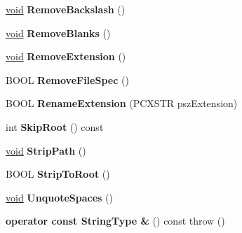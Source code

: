 \begin{DoxyCompactItemize}
\item 
\mbox{\label{class_a_t_l_1_1_c_path_t_ad9db826f37bdb070e0e70260bdcdcb09}} 
\hyperlink{interfacevoid}{void} {\bfseries Remove\+Backslash} ()
\item 
\mbox{\label{class_a_t_l_1_1_c_path_t_a18b9704efda370655dc142fdb7efd0d8}} 
\hyperlink{interfacevoid}{void} {\bfseries Remove\+Blanks} ()
\item 
\mbox{\label{class_a_t_l_1_1_c_path_t_ae3b39d1ba14099fe83ec327f7d0b6789}} 
\hyperlink{interfacevoid}{void} {\bfseries Remove\+Extension} ()
\item 
\mbox{\label{class_a_t_l_1_1_c_path_t_afe831f46da3e11aa8834c49880cbc190}} 
B\+O\+OL {\bfseries Remove\+File\+Spec} ()
\item 
\mbox{\label{class_a_t_l_1_1_c_path_t_a3d18881f2b99e4a8a5a18fe986716330}} 
B\+O\+OL {\bfseries Rename\+Extension} (P\+C\+X\+S\+TR psz\+Extension)
\item 
\mbox{\label{class_a_t_l_1_1_c_path_t_a2bb61614610f741fbd9709b6a872bfeb}} 
int {\bfseries Skip\+Root} () const
\item 
\mbox{\label{class_a_t_l_1_1_c_path_t_a7e44128f013368673ed753111aab0591}} 
\hyperlink{interfacevoid}{void} {\bfseries Strip\+Path} ()
\item 
\mbox{\label{class_a_t_l_1_1_c_path_t_a8e8d08b2771875d4acf085b1911d03a8}} 
B\+O\+OL {\bfseries Strip\+To\+Root} ()
\item 
\mbox{\label{class_a_t_l_1_1_c_path_t_a367f7013f5c9d23e0e8376b07c3ac5df}} 
\hyperlink{interfacevoid}{void} {\bfseries Unquote\+Spaces} ()
\item 
\mbox{\label{class_a_t_l_1_1_c_path_t_a3087b62e326e0cb92240729d5bcf5e3d}} 
{\bfseries operator const String\+Type \&} () const  throw ()
\item 
\mbox{\label{class_a_t_l_1_1_c_path_t_ac8d27f6b478578075de91a439a50477a}} 

\end{DoxyCompactItemize}
